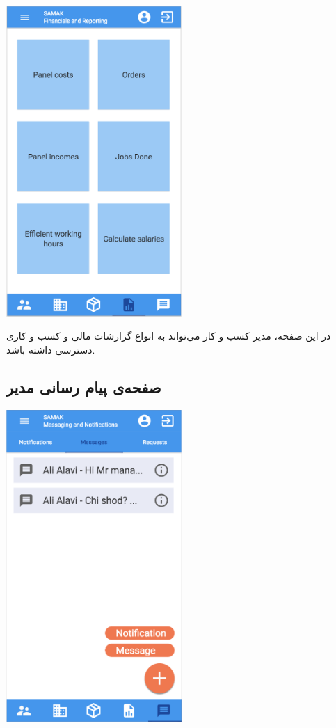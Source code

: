 \begin{center}
\includegraphics[width = 0.5\textwidth]{images/15-reports.png}
\end{center}

در این صفحه، مدیر کسب و کار می‌تواند به انواع گزارشات مالی و کسب و کاری دسترسی داشته باشد.



\subsection{صفحه‌ی پیام رسانی مدیر}

\begin{center}
\includegraphics[width = 0.5\textwidth]{images/16-messaging-manager.png}
\end{center}

